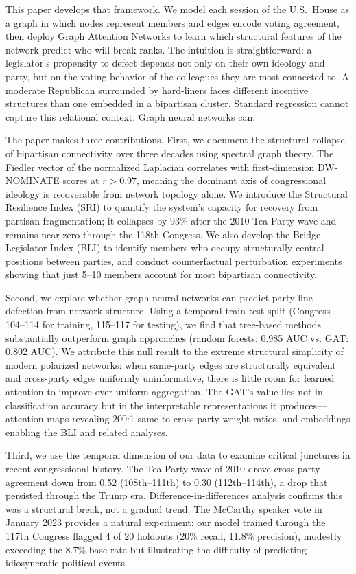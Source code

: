 \documentclass[11pt]{article}
\begin{document}
This paper develops that framework. We model each session of the U.S.\ House as a graph in which nodes represent members and edges encode voting agreement, then deploy Graph Attention Networks to learn which structural features of the network predict who will break ranks. The intuition is straightforward: a legislator's propensity to defect depends not only on their own ideology and party, but on the voting behavior of the colleagues they are most connected to. A moderate Republican surrounded by hard-liners faces different incentive structures than one embedded in a bipartisan cluster. Standard regression cannot capture this relational context. Graph neural networks can.

The paper makes three contributions. First, we document the structural collapse of bipartisan connectivity over three decades using spectral graph theory. The Fiedler vector of the normalized Laplacian correlates with first-dimension DW-NOMINATE scores at $r > 0.97$, meaning the dominant axis of congressional ideology is recoverable from network topology alone. We introduce the Structural Resilience Index (SRI) to quantify the system's capacity for recovery from partisan fragmentation; it collapses by 93\% after the 2010 Tea Party wave and remains near zero through the 118th Congress. We also develop the Bridge Legislator Index (BLI) to identify members who occupy structurally central positions between parties, and conduct counterfactual perturbation experiments showing that just 5--10 members account for most bipartisan connectivity.

Second, we explore whether graph neural networks can predict party-line defection from network structure. Using a temporal train-test split (Congress 104--114 for training, 115--117 for testing), we find that tree-based methods substantially outperform graph approaches (random forests: 0.985 AUC vs. GAT: 0.802 AUC). We attribute this null result to the extreme structural simplicity of modern polarized networks: when same-party edges are structurally equivalent and cross-party edges uniformly uninformative, there is little room for learned attention to improve over uniform aggregation. The GAT's value lies not in classification accuracy but in the interpretable representations it produces---attention maps revealing 200:1 same-to-cross-party weight ratios, and embeddings enabling the BLI and related analyses.

Third, we use the temporal dimension of our data to examine critical junctures in recent congressional history. The Tea Party wave of 2010 drove cross-party agreement down from 0.52 (108th--111th) to 0.30 (112th--114th), a drop that persisted through the Trump era. Difference-in-differences analysis confirms this was a structural break, not a gradual trend. The McCarthy speaker vote in January 2023 provides a natural experiment: our model trained through the 117th Congress flagged 4 of 20 holdouts (20\% recall, 11.8\% precision), modestly exceeding the 8.7\% base rate but illustrating the difficulty of predicting idiosyncratic political events.
\end{document}
